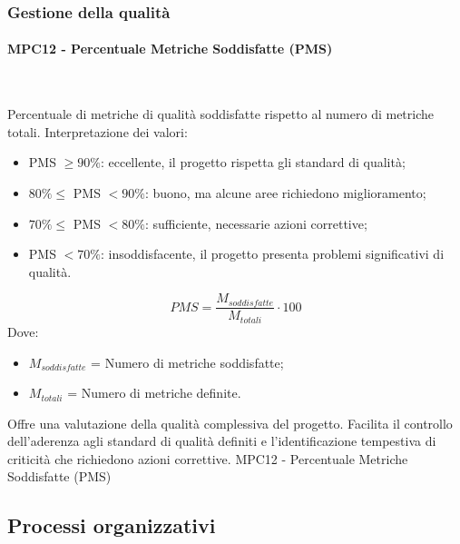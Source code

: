 \documentclass[10pt, letterpaper]{article}
\newcommand{\trisubsection}[1]{\paragraph{#1}\mbox{}\\}
\begin{document}
\subsubsection{Gestione della qualità}
\trisubsection{MPC12 - Percentuale Metriche Soddisfatte (PMS)}
{Percentuale di metriche di qualità soddisfatte rispetto al numero di metriche totali.
    Interpretazione dei valori:
    \begin{itemize}
        \item PMS $\geq 90\%$: eccellente, il progetto rispetta gli standard di qualità;
        \item $80\% \leq $ PMS $ < 90\%$: buono, ma alcune aree richiedono miglioramento;
        \item $70\% \leq $ PMS $ < 80\%$: sufficiente, necessarie azioni correttive;
        \item PMS $< 70\%$: insoddisfacente, il progetto presenta problemi significativi di qualità.
    \end{itemize}}
{\[ PMS = \frac{M_{soddisfatte}}{M_{totali}} \cdot 100 \]
    Dove:
    \begin{itemize}
        \item $M_{soddisfatte}$ = Numero di metriche soddisfatte;
        \item $M_{totali}$ = Numero di metriche definite.
    \end{itemize}
}
{Offre una valutazione della qualità complessiva del progetto.
    Facilita il controllo dell'aderenza agli standard di qualità definiti e
    l'identificazione tempestiva di criticità che richiedono azioni correttive.}
{MPC12 - Percentuale Metriche Soddisfatte (PMS)}

\subsection{Processi organizzativi}
\end{document}
